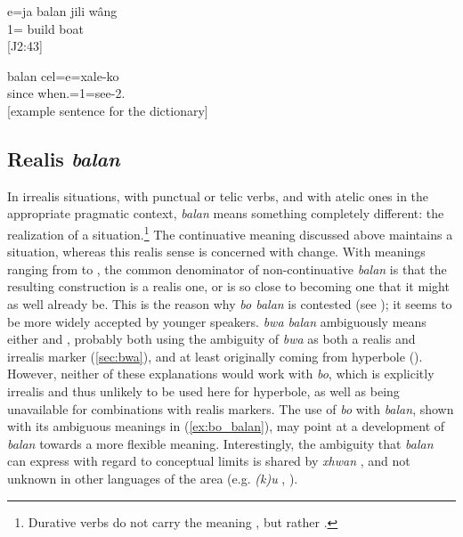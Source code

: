  \ea\label{ex:ja_balan}
 \gll e=ja balan jili wâng\\
  1=  build boat\\
 \glt {} {[J2:43]}
 \z
 
 
 \ea\label{ex:balan_since}
 \gll balan cel=e=xale-ko\\
  since when.=1=see-2.\\
 \glt {} {[example sentence for the dictionary]}
 \z

 
 \subsection{Realis \textit{balan}}
 In irrealis situations, with punctual or telic verbs, and with atelic ones in the appropriate pragmatic context, \textit{balan} means something completely different: the realization of a situation.\footnote{Durative verbs do not carry the meaning , but rather .} The continuative meaning discussed above maintains a situation, whereas this realis sense is concerned with change. With meanings ranging from  to , the common denominator of non-continuative \textit{balan} is that the resulting construction is a realis one, or is so close to becoming one that it might as well already be. This is the reason why \textit{bo balan} is contested (see ); it seems to be more widely accepted by younger speakers. \textit{bwa balan} ambiguously means either  and , probably both using the ambiguity of \textit{bwa} as both a realis and irrealis marker (\ref{sec:bwa}), and at least originally coming from hyperbole (). However, neither of these explanations would work with \textit{bo}, which is explicitly irrealis and thus unlikely to be used here for hyperbole, as well as being unavailable for combinations with realis markers. The use of \textit{bo} with \textit{balan}, shown with its ambiguous meanings in  (\ref{ex:bo_balan}), may point at a development of \textit{balan} towards a more flexible meaning. %
 Interestingly, the ambiguity that \textit{balan} can express with regard to conceptual limits is shared by \textit{xhwan} , and not unknown in other languages of the area (e.g. \textit{(k)u} , \citealt[206, 207]{bril_nelemwa_2002}). 
 
